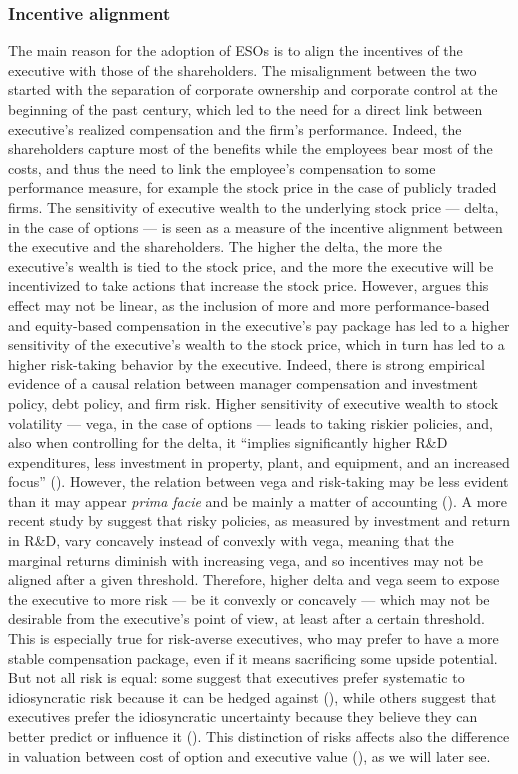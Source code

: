 \subsubsection{Incentive alignment} 
    The main reason for the adoption of ESOs is to align the incentives of the executive with those of the shareholders. The misalignment between the two started with the separation of corporate ownership and corporate control at the beginning of the past century, which led to the need for a direct link between executive's realized compensation and the firm's performance. Indeed, the shareholders capture most of the benefits while the employees bear most of the costs, and thus the need to link the employee's compensation to some performance measure, for example the stock price in the case of publicly traded firms. 
    The sensitivity of executive wealth to the underlying stock price --- delta, in the case of options --- is seen as a measure of the incentive alignment between the executive and the shareholders. The higher the delta, the more the executive's wealth is tied to the stock price, and the more the executive will be incentivized to take actions that increase the stock price. However, \cite{coles2006managerial} argues this effect may not be linear, as the inclusion of more and more performance-based and equity-based compensation in the executive's pay package has led to a higher sensitivity of the executive's wealth to the stock price, which in turn has led to a higher risk-taking behavior by the executive. Indeed, there is strong empirical evidence of a causal relation between manager compensation and investment policy, debt policy, and firm risk. Higher sensitivity of executive wealth to stock volatility --- vega, in the case of options --- leads to taking riskier policies, and, also when controlling for the delta, it ``implies significantly higher R\&D expenditures, less investment in property, plant, and equipment, and an increased focus'' (\cite{coles2006managerial}). However, the relation between vega and risk-taking may be less evident than it may appear \textit{prima facie} and be mainly a matter of accounting (\cite{hayes2012stock}). A more recent study by \cite{billings2020can} suggest that risky policies, as measured by investment and return in R\&D, vary concavely instead of convexly with vega, meaning that the marginal returns diminish with increasing vega, and so incentives may not be aligned after a given threshold.
    Therefore, higher delta and vega seem to expose the executive to more risk --- be it convexly or concavely --- which may not be desirable from the executive's point of view, at least after a certain threshold. This is especially true for risk-averse executives, who may prefer to have a more stable compensation package, even if it means sacrificing some upside potential. But not all risk is equal: some suggest that executives prefer systematic to idiosyncratic risk because it can be hedged against (\cite{armstrong2012executive}), while others suggest that executives prefer the idiosyncratic uncertainty because they believe they can better predict or influence it (\cite{heron2017stock}). This distinction of risks affects also the difference in valuation between cost of option and executive value (\cite{meulbroek2001efficiency}), as we will later see.
